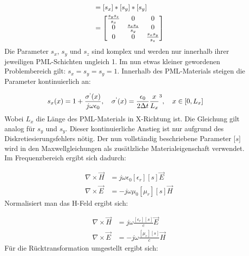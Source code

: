 \documentclass[11pt, ngerman]{article}
\begin{document}
\begin{align}
	[s] &= [s_x] * [s_y] * [s_y]\\
	&=\dt{\frac{s_y s_z}{s_x}}{\frac{s_x s_z}{s_y}}{\frac{s_x s_y}{s_z}}
\end{align}
Die Parameter \(s_x\), \(s_y\) und \(s_z\) sind komplex und werden nur innerhalb ihrer jeweiligen PML-Schichten ungleich 1.
Im nun etwas kleiner gewordenen Problembereich gilt: \(s_x = s_y = s_y = 1\).
Innerhalb des PML-Materials steigen die Parameter kontinuierlich an:

\begin{align}
	s_x(x) &= 1 + \frac{\sigma^`(x)}{j\omega\epsilon_0},\quad\sigma^`(x) = \frac{\epsilon_0}{2\Delta t}\frac{x}{L_x}^3,\quad x \in [0, L_x]
\end{align}
Wobei \(L_x\) die L\"ange des PML-Materials in X-Richtung ist. Die Gleichung gilt analog f\"ur \(s_y\) und \(s_y\).
Dieser kontinuierliche Anstieg ist nur aufgrund des Diskretiesierungsfehlers n\"otig.
Der nun vollst\"andig beschriebene Parameter \([s\)] wird in den Maxwellgleichungen als
zus\"atlzliche Materialeigenschaft verwendet. Im Frequenzbereich ergibt sich dadurch:

\begin{align}
	\nabla\times\vec{H} &=  j\omega\epsilon_0[\epsilon_r][s]\vec{E}\\
	\nabla\times\vec{E} &= -j\omega\mu_0[\mu_r][s]\vec{H}
\end{align}
\newpage
\noindent Normalisiert man das H-Feld ergibt sich:

\begin{align}
	\nabla\times\vec{H} &= j\omega\frac{[\epsilon_r][s]}{c}\vec{E}\\
	\nabla\times\vec{E} &= -j\omega\frac{[\mu_r][s]}{c}\vec{H}
\end{align}
F\"ur die R\"ucktransformation umgestellt ergibt sich:
\end{document}
